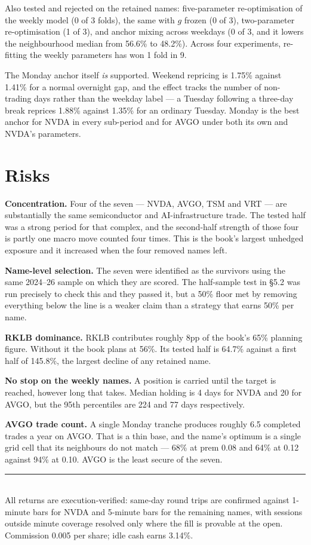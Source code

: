 \documentclass[11pt]{article}
\begin{document}
Also tested and rejected on the retained names: five-parameter re-optimisation of the weekly model
(0 of 3 folds), the same with $g$ frozen (0 of 3), two-parameter re-optimisation (1 of 3), and
anchor mixing across weekdays (0 of 3, and it lowers the neighbourhood median from 56.6\% to
48.2\%). Across four experiments, re-fitting the weekly parameters has won 1 fold in 9.

The Monday anchor itself \emph{is} supported. Weekend repricing is 1.75\% against 1.41\% for a
normal overnight gap, and the effect tracks the number of non-trading days rather than the
weekday label --- a Tuesday following a three-day break reprices 1.88\% against 1.35\% for an
ordinary Tuesday. Monday is the best anchor for NVDA in every sub-period and for AVGO under both
its own and NVDA's parameters.

\section{Risks}

\textbf{Concentration.} Four of the seven --- NVDA, AVGO, TSM and VRT --- are substantially the
same semiconductor and AI-infrastructure trade. The tested half was a strong period for that
complex, and the second-half strength of those four is partly one macro move counted four times.
This is the book's largest unhedged exposure and it increased when the four removed names left.

\textbf{Name-level selection.} The seven were identified as the survivors using the same
2024--26 sample on which they are scored. The half-sample test in \S5.2 was run precisely to
check this and they passed it, but a 50\% floor met by removing everything below the line is a
weaker claim than a strategy that earns 50\% per name.

\textbf{RKLB dominance.} RKLB contributes roughly 8pp of the book's 65\% planning figure. Without
it the book plans at 56\%. Its tested half is 64.7\% against a first half of 145.8\%, the largest
decline of any retained name.

\textbf{No stop on the weekly names.} A position is carried until the target is reached, however
long that takes. Median holding is 4 days for NVDA and 20 for AVGO, but the 95th percentiles are
224 and 77 days respectively.

\textbf{AVGO trade count.} A single Monday tranche produces roughly 6.5 completed trades a year
on AVGO. That is a thin base, and the name's optimum is a single grid cell that its neighbours do
not match --- 68\% at prem 0.08 and 64\% at 0.12 against 94\% at 0.10. AVGO is the least secure of
the seven.

\vfill
{\color{bcrule}\rule{\textwidth}{0.6pt}}\\[0.2em]
{\footnotesize\color{bcgrey} All returns are execution-verified: same-day round trips are
confirmed against 1-minute bars for NVDA and 5-minute bars for the remaining names, with sessions
outside minute coverage resolved only where the fill is provable at the open. Commission 0.005 per
share; idle cash earns 3.14\%.}
\end{document}
